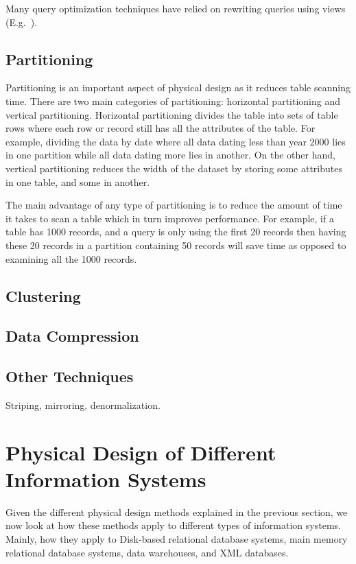 \documentclass[12pt,a4paper]{article}
\begin{document}
Many query optimization techniques have relied on rewriting queries using views (E.g.~\cite{levy1995answering, gupta1995aggregate, goldstein2001optimizing, abiteboul1998complexity}).

\subsection{Partitioning}

Partitioning is an important aspect of physical design as it reduces table scanning time. There are two main categories of partitioning: horizontal partitioning and vertical partitioning. Horizontal partitioning divides the table into sets of table rows where each row or record still has all the attributes of the table. For example, dividing the data by date where all data dating less than year 2000 lies in one partition while all data dating more lies in another. On the other hand, vertical partitioning reduces the width of the dataset by storing some attributes in one table, and some in another.

The main advantage of any type of partitioning is to reduce the amount of time it takes to scan a table which in turn improves performance. For example, if a table has 1000 records, and a query is only using the first 20 records then having these 20 records in a partition containing 50 records will save time as opposed to examining all the 1000 records.

\subsection{Clustering}

\subsection{Data Compression}

\subsection{Other Techniques}

Striping, mirroring, denormalization.

\section{Physical Design of Different Information Systems}
\label{SEC-DIFFSYS}

Given the different physical design methods explained in the previous section, we now look at how these methods apply to different types of information systems. Mainly, how they apply to Disk-based relational database systems, main memory relational database systems, data warehouses, and XML databases.
\end{document}
